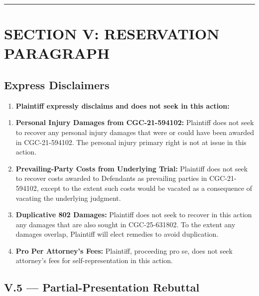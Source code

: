 \begin{center}\rule{0.5\linewidth}{0.5pt}\end{center}

\label{toc:section-v-reservation-paragraph}
\section{SECTION V: RESERVATION PARAGRAPH}\label{section-v-reservation-paragraph}

\subsection{Express Disclaimers}\label{express-disclaimers}

\begin{enumerate}
\def\labelenumi{\arabic{enumi}.}
\setcounter{enumi}{31}
\tightlist
\item
  \textbf{Plaintiff expressly disclaims and does not seek in this action:}
\end{enumerate}

\begin{enumerate}
\def\labelenumi{(\alph{enumi})}
\item
  \textbf{Personal Injury Damages from CGC-21-594102:} Plaintiff does not seek to recover any personal injury damages that were or could have been awarded in CGC-21-594102. The personal injury primary right is not at issue in this action.
\item
  \textbf{Prevailing-Party Costs from Underlying Trial:} Plaintiff does not seek to recover costs awarded to Defendants as prevailing parties in CGC-21-594102, except to the extent such costs would be vacated as a consequence of vacating the underlying judgment.
\item
  \textbf{Duplicative 802 Damages:} Plaintiff does not seek to recover in this action any damages that are also sought in CGC-25-631802. To the extent any damages overlap, Plaintiff will elect remedies to avoid duplication.
\item
  \textbf{Pro Per Attorney's Fees:} Plaintiff, proceeding pro se, does not seek attorney's fees for self-representation in this action.
\end{enumerate}

\subsection{\textsection{}V.5 --- Partial-Presentation Rebuttal}\label{v.5-partial-presentation-rebuttal}

